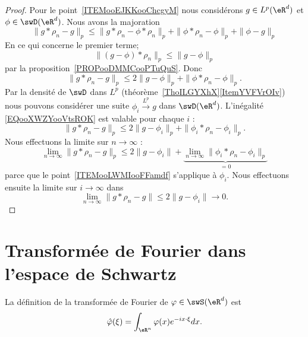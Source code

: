 \begin{proof}
	Pour le point~\ref{ITEMooEJKKooChcgyM} nous considérons \( g\in L^p(\eR^d)\) et \( \phi\in \swD(\eR^d)\). Nous avons la majoration
	\begin{equation}
		\| g*\rho_n-g \|_p\leq \| g*\rho_n-\phi*\rho_n \|_p+\| \phi*\rho_n-\phi \|_p+\| \phi-g \|_p
	\end{equation}
	En ce qui concerne le premier terme;
	\begin{equation}
		\| (g-\phi)*\rho_n \|_p\leq \| g-\phi \|_p
	\end{equation}
	par la proposition~\ref{PROPooDMMCooPTuQuS}. Donc
	\begin{equation}		\label{EQooXWZYooVtsROK}
		\| g*\rho_n-g \|_p\leq 2\| g-\phi \|_p+\| \phi*\rho_n-\phi \|_p.
	\end{equation}
	Par la densité de \( \swD\) dans \( L^p\) (théorème~\ref{ThoILGYXhX}\ref{ItemYVFVrOIv}) nous pouvons considérer une suite \( \phi_i\stackrel{L^p}{\longrightarrow}g\) dans \( \swD(\eR^d)\). L'inégalité \eqref{EQooXWZYooVtsROK} est valable pour chaque \( i\) :
	\begin{equation}
		\| g*\rho_n-g \|_p\leq 2\| g-\phi_i \|_p+\| \phi_i*\rho_n-\phi_i \|_p.
	\end{equation}
	Nous effectuons la limite sur \( n\to \infty\) :
	\begin{equation}
		\lim_{n\to \infty} \| g*\rho_n-g \|_p\leq 2\| g-\phi_i \|+\underbrace{\lim_{n\to \infty} \| \phi_i*\rho_n-\phi_i \|_p}_{=0}
	\end{equation}
	parce que le point~\ref{ITEMooLWMIooFFamdf} s'applique à \( \phi_i\). Nous effectuons ensuite la limite sur \( i\to \infty\) dans
	\begin{equation}
		\lim_{n\to \infty} \| g*\rho_n-g \|\leq 2\| g-\phi_i \|\to 0.
	\end{equation}
\end{proof}

\section{Transformée de Fourier dans l'espace de Schwartz}

La définition de la transformée de Fourier de \( \varphi\in\swS(\eR^d)\) est
\begin{equation}
	\hat  \varphi(\xi)=\int_{\eR^n}\varphi(x) e^{-ix\cdot \xi}dx.
\end{equation}

